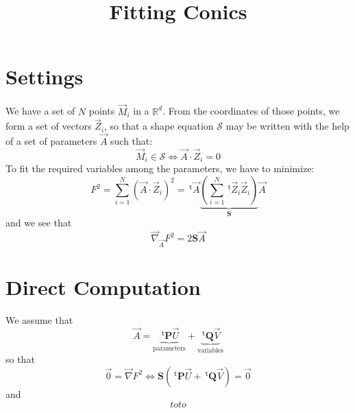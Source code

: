 \documentclass[aps]{revtex4}
\newcommand{\mymat}[1]{\boldsymbol{#1}}
\newcommand{\mytrn}[1]{~^{\mathsf{t}}\!{#1}}
\newcommand{\mygrad}{\vec{\nabla}}
\begin{document}
\title{Fitting Conics}
\maketitle
\section{Settings}

We have a set of $N$ points $\vec{M}_i$ in a $\mathbb{R}^d$.
From the coordinates of those points, we form a set of vectors $\vec{Z}_i$,
so that a shape equation $\mathcal{S}$ may be written with the help of a set of parameters $\vec{A}$
such that:
\begin{equation}
\vec{M}_i\in\mathcal{S} \Leftrightarrow \vec{A}\cdot\vec{Z}_i = 0
\end{equation}
To fit the required variables among the parameters, we have to minimize:
\begin{equation}
 F^2 = \sum_{i=1}^N \left(\vec{A}\cdot\vec{Z}_i\right)^2
  = \mytrn{\vec{A}} \underbrace{\left(\sum_{i=1}^N\mytrn{\vec{Z}_i}\vec{Z}_i\right)}_{\mymat{S}} \vec{A}
\end{equation}
and we see that
\begin{equation}
	\mygrad_{\vec{A}} F^2 = 2 \mymat{S} \vec{A}
\end{equation}

\section{Direct Computation}
We assume that
\begin{equation}
	\vec{A} = \underbrace{\mytrn{\mymat{P}} \vec{U}}_{\text{parameters}} + \underbrace{\mytrn{\mymat{Q}} \vec{V}}_{\text{variables}}
\end{equation}
so that
\begin{equation}
 \vec{0} = \mygrad F^2 \Leftrightarrow \mymat{S}\left(\mytrn{\mymat{P}} \vec{U} + \mytrn{\mymat{Q}} \vec{V}\right) = \vec{0}
\end{equation}
and
\begin{equation}
	toto
\end{equation}
\end{document}
